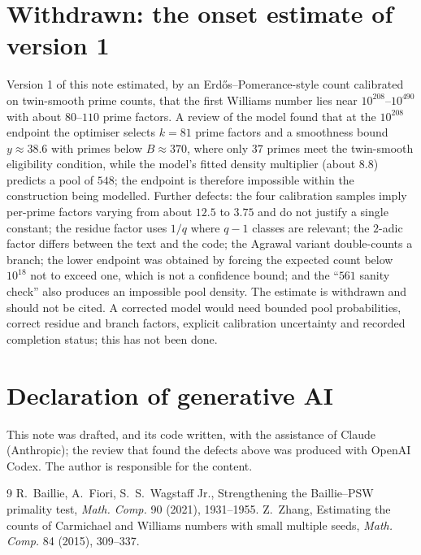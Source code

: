 \documentclass[11pt]{amsart}
\begin{document}
\section{Withdrawn: the onset estimate of version 1}\label{sec:withdrawn}
Version 1 of this note estimated, by an Erd\H{o}s--Pomerance-style count calibrated on twin-smooth prime counts, that the first Williams number lies near $10^{208}$--$10^{490}$ with about $80$--$110$ prime factors. A review of the model found that at the $10^{208}$ endpoint the optimiser selects $k=81$ prime factors and a smoothness bound $y\approx38.6$ with primes below $B\approx370$, where only $37$ primes meet the twin-smooth eligibility condition, while the model's fitted density multiplier (about $8.8$) predicts a pool of $548$; the endpoint is therefore impossible within the construction being modelled. Further defects: the four calibration samples imply per-prime factors varying from about $12.5$ to $3.75$ and do not justify a single constant; the residue factor uses $1/q$ where $q-1$ classes are relevant; the $2$-adic factor differs between the text and the code; the Agrawal variant double-counts a branch; the lower endpoint was obtained by forcing the expected count below $10^{18}$ not to exceed one, which is not a confidence bound; and the ``$561$ sanity check'' also produces an impossible pool density. The estimate is withdrawn and should not be cited. A corrected model would need bounded pool probabilities, correct residue and branch factors, explicit calibration uncertainty and recorded completion status; this has not been done.

\section*{Declaration of generative AI}
This note was drafted, and its code written, with the assistance of Claude (Anthropic); the review that found the defects above was produced with OpenAI Codex. The author is responsible for the content.

\begin{thebibliography}{9}
 R.~Baillie, A.~Fiori, S.~S.~Wagstaff Jr., Strengthening the Baillie--PSW primality test, \emph{Math. Comp.} 90 (2021), 1931--1955.
 Z.~Zhang, Estimating the counts of Carmichael and Williams numbers with small multiple seeds, \emph{Math. Comp.} 84 (2015), 309--337.
\end{thebibliography}
\end{document}
